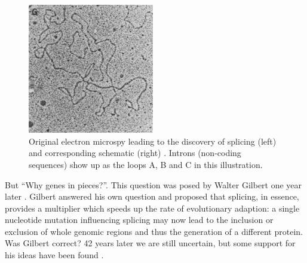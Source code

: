 \begin{figure}
	\centering
		\includegraphics[width=0.49\textwidth]{../visualizations/ch1-introduction/original_electron_microscopy.jpg}
	\caption{Original electron microspy leading to the discovery of splicing (left) and corresponding schematic (right) \cite{discoveryofsplicing}. Introns (non-coding sequences) show up as the loops A, B and C in this illustration.  }
	\label{fig:discovery}

\end{figure}

But ``Why genes in pieces?''. This question was posed by Walter Gilbert one year later \cite{whygenesinpieces}. Gilbert answered his own question and proposed that splicing, in essence, provides a multiplier which speeds up the rate of evolutionary adaption: a single nucleotide mutation influencing splicing may now lead to the inclusion or exclusion of whole genomic regions and thus the generation of a different protein. Was Gilbert correct? 42 years later we are still uncertain, but some support for his ideas have been found \cite{whyrevisited}. %

